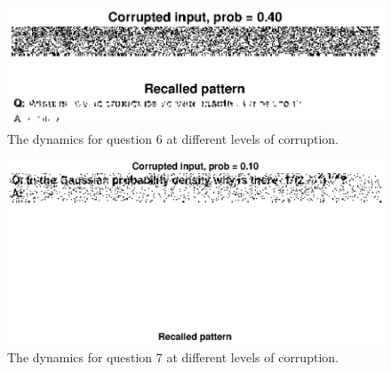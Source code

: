 \documentclass[11pt, oneside]{article}
\begin{document}
  \begin{figure}[H]
  \includegraphics[width=1\textwidth]{q6corrupt.eps}
  \caption{The dynamics for question 6 at different levels of corruption.}
  \label{fig:q6corrupt}
  \end{figure}

  \begin{figure}[H]
  \includegraphics[width=1\textwidth]{q7corrupt.eps}
  \caption{The dynamics for question 7 at different levels of corruption.}
  \label{fig:q7corrupt}
  \end{figure}
\end{document}
